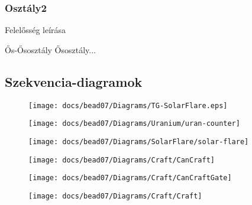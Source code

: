 \documentclass[../../projlab]{subfiles}
\begin{document}
\subsubsection{Osztály2}
\begin{class-template-responsibility}
    Felelősség leírása
\end{class-template-responsibility}
\begin{class-template-baseclass}
    Ős-Ősosztály \baseclass Ősosztály... 
\end{class-template-baseclass}
\begin{class-template-method}
\end{class-template-method}

\subsection{Szekvencia-diagramok}

\begin{figure}[H] 
    \centering 
    \texttt{[image: docs/bead07/Diagrams/TG-SolarFlare.eps]} 
    \caption{} 
\end{figure}

\begin{figure}[H] 
    \centering 
    \texttt{[image: docs/bead07/Diagrams/Uranium/uran-counter]} 
    \caption{} 
\end{figure}

\begin{figure}[H] 
    \centering 
    \texttt{[image: docs/bead07/Diagrams/SolarFlare/solar-flare]} 
    \caption{} 
\end{figure}

\begin{figure}[H] 
    \centering 
    \texttt{[image: docs/bead07/Diagrams/Craft/CanCraft]} 
    \caption{} 
\end{figure} 

\begin{figure}[H] 
    \centering 
    \texttt{[image: docs/bead07/Diagrams/Craft/CanCraftGate]} 
    \caption{} 
\end{figure} 

\begin{figure}[H] 
    \centering 
    \texttt{[image: docs/bead07/Diagrams/Craft/Craft]} 
    \caption{} 
\end{figure} 
\end{document}

